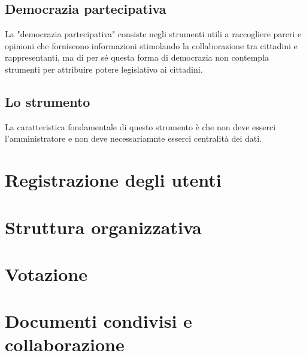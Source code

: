 \documentclass[10pt,a4paper]{book}
\begin{document}
\section{Democrazia partecipativa}
La "democrazia partecipativa" consiste negli strumenti utili a raccogliere pareri e opinioni che forniscono informazioni stimolando la collaborazione tra cittadini e rappresentanti, ma di per sé questa forma di democrazia non contempla strumenti per attribuire potere legislativo ai cittadini.

\section{Lo strumento}
La caratteristica fondamentale di questo strumento è che non deve esserci l'amministratore e non deve necessariamnte esserci centralità dei dati. 
\chapter{Registrazione degli utenti}
\chapter{Struttura organizzativa}
\chapter{Votazione}
\chapter{Documenti condivisi e collaborazione}
\end{document}
